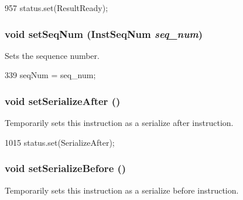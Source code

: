 \begin{DoxyCode}
957 { status.set(ResultReady); }
\end{DoxyCode}
\hypertarget{classInOrderDynInst_ad5dc49b24f38355cef2f30d4948ba38a}{
\subsubsection[{setSeqNum}]{\setlength{\rightskip}{0pt plus 5cm}void setSeqNum ({\bf InstSeqNum} {\em seq\_\-num})}}
\label{classInOrderDynInst_ad5dc49b24f38355cef2f30d4948ba38a}
Sets the sequence number. 


\begin{DoxyCode}
339 { seqNum = seq_num; }
\end{DoxyCode}
\hypertarget{classInOrderDynInst_a3e4776abfedcc80df8c826a7f3c3efd3}{
\subsubsection[{setSerializeAfter}]{\setlength{\rightskip}{0pt plus 5cm}void setSerializeAfter ()}}
\label{classInOrderDynInst_a3e4776abfedcc80df8c826a7f3c3efd3}
Temporarily sets this instruction as a serialize after instruction. 


\begin{DoxyCode}
1015 { status.set(SerializeAfter); }
\end{DoxyCode}
\hypertarget{classInOrderDynInst_a820fdb5f79e789fc8efffb15f1995695}{
\subsubsection[{setSerializeBefore}]{\setlength{\rightskip}{0pt plus 5cm}void setSerializeBefore ()}}
\label{classInOrderDynInst_a820fdb5f79e789fc8efffb15f1995695}
Temporarily sets this instruction as a serialize before instruction. 


